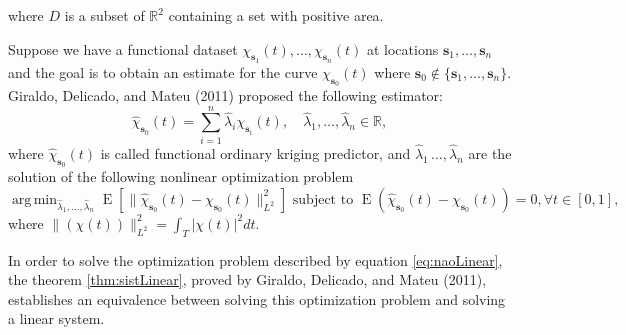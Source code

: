\documentclass[12pt,]{article}
\DeclareMathOperator{\espe}{E}
\DeclareMathOperator*{\argmin}{arg\,min}
\theoremstyle{definition}
\theoremstyle{definition}
\theoremstyle{definition}
\theoremstyle{remark}
\begin{document}
where \(D\) is a subset of \(\mathbb{R}^2\) containing a set with positive area.

Suppose we have a functional dataset \(\chi_{\bm{s}_1}(t), \dots, \chi_{\bm{s}_n}(t)\) at locations \(\bm{s}_1, \dots, \bm{s}_n\) and the goal is to obtain an estimate for the curve \(\chi_{\bm{s}_0}(t)\) where \(\bm{s}_0 \not\in \{\bm{s}_1, \dots, \bm{s}_n\}\). Giraldo, Delicado, and Mateu (2011) proposed the following estimator:
\begin{equation}
\hat\chi_{\bm{s}_0} (t) = \sum_{i=1}^{n} \hat\lambda_i \chi_{\bm{s}_i}(t),\quad \hat\lambda_1, \dots, \hat\lambda_{n} \in \mathbb{R},
\label{eq:ModelOrdinary}
\end{equation}
where \(\hat\chi_{\bm{s}_0}(t)\) is called functional ordinary kriging predictor, and \(\hat\lambda_1\, \dots, \hat\lambda_{n}\) are the solution of the following nonlinear optimization problem
\begin{equation}
\argmin_{\hat{\lambda}_1, \dots, \hat{\lambda}_{n}} \espe \left[ \lVert\hat{\chi}_{\bm{s}_0}(t) - \chi_{\bm{s}_0}(t) \rVert^2_{L^2}\right] \mbox{ subject to }\espe(\hat{\chi}_{\bm{s}_0}(t) - \chi_{\bm{s}_0}(t)) =0, \forall t \in [0,1],
\label{eq:naoLinear}
\end{equation}
where \(\lVert(\chi(t))\rVert^2_{L^2}= \int_{T} \lvert \chi(t)\rvert^2 dt.\)

In order to solve the optimization problem described by equation \eqref{eq:naoLinear}, the theorem \ref{thm:sistLinear}, proved by Giraldo, Delicado, and Mateu (2011), establishes an equivalence between solving this optimization problem and solving a linear system.
\end{document}
